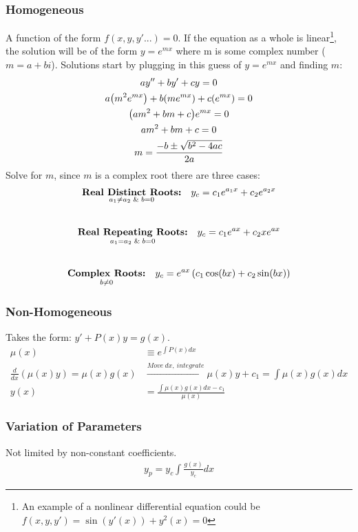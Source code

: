     \subsubsection{Homogeneous}
        A function of the form $f(x,y,y'...)=0$. If the equation as a whole is linear\footnote{An example of a nonlinear differential equation could be $f(x,y,y')=\sin(y'(x))+y^2(x)=0$}, 
        the solution will be of the form \(y=e^{mx}\) where m is some complex number ($m=a+bi$). Solutions start by plugging in this guess of $y=e^{mx}$ and finding $m$:
        {
        \length[0.25 cm]
        \begin{gather*}
            ay''+by'+cy=0 
            \\
            a\qty(m^2e^{m x})+b \qty(m e^{m x})+c \qty(e^{m x})=0
            \\
            \qty(am^2+b m+c)e^{mx}=0
            \\
            am^2+b m+c=0
            \\
            m=\frac{-b\pm\sqrt{b^2-4ac}}{2a}
        \end{gather*}
        }
        Solve for $m$, since $m$ is a complex root there are three cases:
        \begin{gather}
            \underset { a_1 \neq a_2\And b=0 }{\textbf{Real Distinct Roots:}}\quad y_c=c_1e^{a_1x}+c_2e^{a_2x}\\[0.7 cm]
            \underset{a_1=a_2 \And b=0 }{\textbf{Real Repeating Roots:}}\quad y_c=c_1e^{ax}+c_2xe^{ax}\\[0.7 cm]
            \underset{b \neq 0}{\textbf{Complex Roots:}}\quad y_c=e^{ax}\left(c_1\cos(bx)+c_2\sin(bx)\right)
        \end{gather}
    \subsubsection{Non-Homogeneous}
        Takes the form: $y'+P(x)y=g(x)$. 
        \begin{align*}
            \mu(x)
            &\equiv e^{\int P(x) dx}\\
            \frac{d}{dx}(\mu(x)y)=\mu(x)g(x) 
            &\xrightarrow{Move\ dx,\ integrate} \mu(x)y +c_1=\int \mu(x) g(x)dx\\
            y(x)
            &=\frac{\int \mu(x) g(x)dx - c_1}{\mu(x)}
        \end{align*}

        \subsubsection*{Variation of Parameters}
        Not limited by non-constant coefficients. 
        \begin{align*}
            y_p=y_c\int{\frac{g(x)}{y_c}dx}
        \end{align*}    
